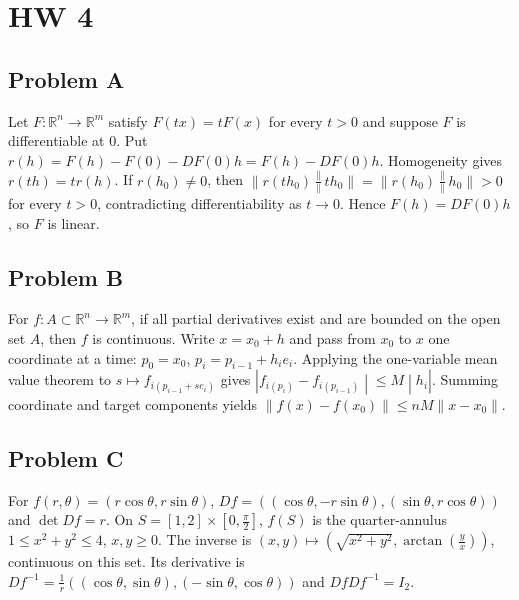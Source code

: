 \chapter{HW 4}

\section{Problem A}

Let \(F:\mathbb{R}^{n}\rightarrow\mathbb{R}^{m}\) satisfy \(F\left( {tx} \right) = tF(x)\) for every \(t > 0\) and suppose \(F\) is differentiable at \(0\). Put \(r(h) = F(h) - F(0) - DF(0)h = F(h) - DF(0)h\). Homogeneity gives \(r\left( {th} \right) = tr(h)\). If \(r\left( h_{0} \right) \neq 0\), then \(\| r\left( {th_{0}} \right)\frac{\|}{\|}th_{0}\| = \| r\left( h_{0} \right)\frac{\|}{\|}h_{0}\| > 0\) for every \(t > 0\), contradicting differentiability as \(t\rightarrow 0\). Hence \(F(h) = DF(0)h\), so \(F\) is linear.

\section{Problem B}

For \(f:A \subset \mathbb{R}^{n}\rightarrow\mathbb{R}^{m}\), if all partial derivatives exist and are bounded on the open set \(A\), then \(f\) is continuous. Write \(x = x_{0} + h\) and pass from \(x_{0}\) to \(x\) one coordinate at a time: \(p_{0} = x_{0}\), \(p_{i} = p_{i - 1} + h_{i}e_{i}\). Applying the one-variable mean value theorem to \(s\mapsto f_{i{({p_{i - 1} + se_{i}})}}\) gives \(\left. |f_{i{(p_{i})}} - f_{i{(p_{i - 1})}} \middle| \leq M \middle| h_{i}| \right.\). Summing coordinate and target components yields \(\| f(x) - f\left( x_{0} \right)\| \leq nM\| x - x_{0}\|\).

\section{Problem C}

For \(f\left( {r,\theta} \right) = \left( {r\cos\theta,r\sin\theta} \right)\), \(Df = \left( {\left( {\cos\theta, - r\sin\theta} \right),\left( {\sin\theta,r\cos\theta} \right)} \right)\) and \(\det Df = r\). On \(S = \left\lbrack {1,2} \right\rbrack \times \left\lbrack {0,\frac{\pi}{2}} \right\rbrack\), \(f(S)\) is the quarter-annulus \(1 \leq x^{2} + y^{2} \leq 4\), \(x,y \geq 0\). The inverse is \(\left( {x,y} \right)\mapsto\left( {\sqrt{x^{2} + y^{2}},\arctan\left( \frac{y}{x} \right)} \right)\), continuous on this set. Its derivative is \(Df^{- 1} = \frac{1}{r}\left( {\left( {\cos\theta,\sin\theta} \right),\left( {- \sin\theta,\cos\theta} \right)} \right)\) and \(DfDf^{- 1} = I_{2}\).

